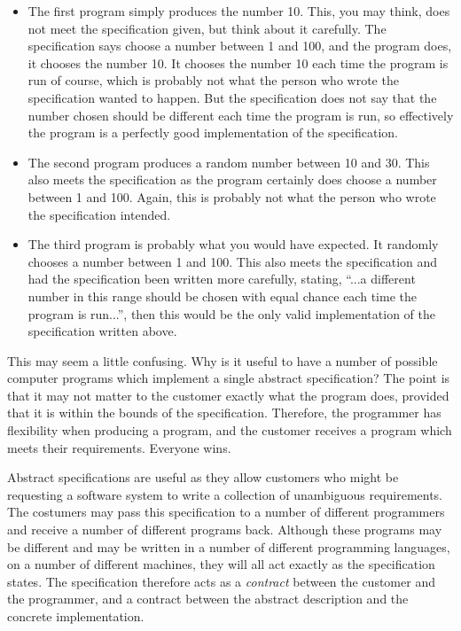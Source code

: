 \begin{itemize}

\item
The first program simply produces the number 10. This, you may think, does
not meet the specification given, but think about it carefully. The 
specification says choose a number between 1 and 100, and the program does,
it chooses the number 10. It chooses the number 10 each time the
program is run of course, which 
is probably not what the person who wrote the specification wanted to happen.
But the specification does not say that the number chosen should be different
each time the program is run, so effectively the program is a perfectly 
good implementation of the specification. 

\item
The second program produces a random number between 10 and 30. This also 
meets the specification as the program certainly does choose a number 
between 1 and 100. Again, this is probably not what the person who wrote
the specification intended. 

\item
The third program is probably what you would have expected. It randomly chooses
a number 
between 1 and 100. This also meets the specification and had the 
specification been written more carefully, stating, ``...a different number
in this range should be chosen with equal chance each time the program is 
run...'', then this would be the only valid implementation of the 
specification written above.

\end{itemize}


This may seem a little confusing. Why is it useful to have a number of 
possible computer programs which implement a single abstract specification?
The point is
that it may not matter to the customer exactly what the program does,  
provided that it is within the bounds of the specification. Therefore, the 
programmer has flexibility when producing a program, and the customer
receives a program which meets their requirements. Everyone wins. 

Abstract specifications are useful as they allow customers who might
be requesting a software system to write a collection of unambiguous
requirements. The costumers may pass this specification to a number of different
programmers and receive a number of different programs
back. Although these programs may be different and may be written in a
number of different programming languages, on a number of different
machines, they will all act
exactly as the specification states. The specification therefore acts
as a {\em contract} between the customer and the programmer, and a
contract between the abstract description and the concrete
implementation. 


